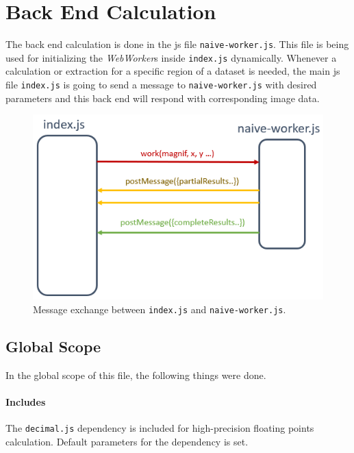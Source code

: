 \section{Back End Calculation}

The back end calculation is done in the \gls{js} file \texttt{naive-worker.js}. This file is being used for initializing the \emph{WebWorker}s inside \texttt{index.js} dynamically. Whenever a calculation or extraction for a specific region of a dataset is needed, the main \gls{js} file \texttt{index.js} is going to send a message to \texttt{naive-worker.js} with desired parameters and this back end will respond with corresponding image data.

\begin{figure}[th]
\centering
\includegraphics[width=\textwidth,keepaspectratio]{Figures/Chapter4/messageexchange.png}
\decoRule
\caption[Message Exchange]{Message exchange between \texttt{index.js} and \texttt{naive-worker.js}.}
\label{fig:messageexchange}
\end{figure}

\subsection{Global Scope}

In the global scope of this file, the following things were done.

\paragraph{Includes} The \texttt{decimal.js} dependency is included for high-precision floating points calculation. Default parameters for the dependency is set.

